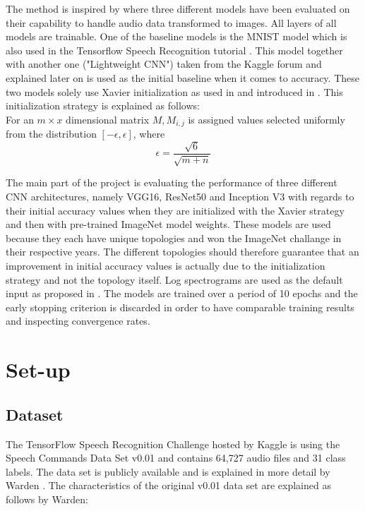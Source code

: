 \documentclass{article}
\theoremstyle{definition}
\theoremstyle{remark}
\begin{document}
The method is inspired by \cite{gouda2018speech} where three different models have been evaluated on their capability to handle audio data transformed to images. All layers of all models are trainable. One of the baseline models is the MNIST model which is also used in the Tensorflow Speech Recognition tutorial \cite{tutorial}. This model together with another one ("Lightweight CNN") taken from the Kaggle forum and explained later on is used as the initial baseline when it comes to accuracy. These two models solely use Xavier initialization as used in \cite{gouda2018speech} and introduced in \cite{glorot2010understanding}. This initialization strategy is explained as follows:\\


For an $m \times x$ dimensional matrix $M, M_{i,j}$ is assigned values selected uniformly from the distribution $[-\epsilon, \epsilon]$, where
\begin{equation} \label{eq:xavier}
\epsilon = \frac{\sqrt{6}}{\sqrt{m + n}}
\end{equation}

The main part of the project is evaluating the performance of three different CNN architectures, namely VGG16, ResNet50 and Inception V3 with regards to their initial accuracy values when they are initialized with the Xavier strategy and then with pre-trained ImageNet model weights. These models are used because they each have unique topologies and won the ImageNet challange in their respective years. The different topologies should therefore guarantee that an improvement in initial accuracy values is actually due to the initialization strategy and not the topology itself. Log spectrograms are used as the default input as proposed in \cite{gouda2018speech}. The models are trained over a period of 10 epochs and the early stopping criterion is discarded in order to have comparable training results and inspecting convergence rates.



\section{Set-up} \label{setup}



\subsection{Dataset} 

The TensorFlow Speech Recognition Challenge hosted by Kaggle \cite{kaggle_challenge} is using the Speech Commands Data Set v0.01 and contains 64,727 audio files and 31 class labels. The data set is publicly available \cite{scd_v1} and is explained in more detail by Warden \cite{warden2018speech}. The characteristics of the original v0.01 data set are explained as follows by Warden:
\end{document}
